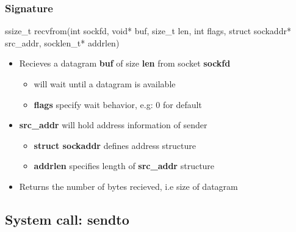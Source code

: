 \documentclass{report}
\begin{document}
    \subsubsection{Signature}
    \bigbreak \noindent 
    \begin{cppcode}
    ssize_t recvfrom(int sockfd, void* buf, size_t len, int flags, struct sockaddr* src_addr, socklen_t* addrlen)
    \end{cppcode}
    \bigbreak \noindent 
    \begin{itemize}
        \item Recieves a datagram \textbf{buf} of size \textbf{len} from socket \textbf{sockfd}
            \begin{itemize}
                \item will wait until a datagram is available
                \item \textbf{flags} specify wait behavior, e.g: 0 for default
            \end{itemize}
        \item \textbf{src\_addr} will hold address information of sender
            \begin{itemize}
                \item \textbf{struct sockaddr} defines address structure
                \item \textbf{addrlen} specifies length of \textbf{src\_addr} structure
            \end{itemize}
        \item Returns the number of bytes recieved, i.e size of datagram
    \end{itemize}

    \bigbreak \noindent 
    \subsection{System call: sendto}
    \bigbreak \noindent 
\end{document}
